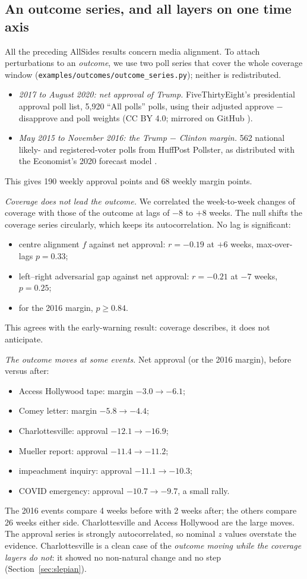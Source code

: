 \documentclass[11pt]{article}
\theoremstyle{definition}
\theoremstyle{remark}
\begin{document}
\subsection{An outcome series, and all layers on one time axis}\label{sec:outcomeseries}
All the preceding AllSides results concern media alignment. To attach perturbations to an \emph{outcome}, we use two poll series that cover the whole coverage window (\texttt{examples/outcomes/outcome\_series.py}); neither is redistributed.
\begin{itemize}
  \item \emph{2017 to August 2020: net approval of Trump.} FiveThirtyEight's presidential approval poll list, 5{,}920 ``All polls'' polls, using their adjusted approve $-$ disapprove and poll weights (CC BY 4.0; mirrored on GitHub \cite{fte}).
  \item \emph{May 2015 to November 2016: the Trump $-$ Clinton margin.} 562 national likely- and registered-voter polls from HuffPost Pollster, as distributed with the Economist's 2020 forecast model \cite{econpolls}.
\end{itemize}
This gives 190 weekly approval points and 68 weekly margin points.

\emph{Coverage does not lead the outcome.} We correlated the week-to-week changes of coverage with those of the outcome at lags of $-8$ to $+8$ weeks. The null shifts the coverage series circularly, which keeps its autocorrelation. No lag is significant:
\begin{itemize}
  \item centre alignment $f$ against net approval: $r=-0.19$ at $+6$ weeks, max-over-lags $p=0.33$;
  \item left--right adversarial gap against net approval: $r=-0.21$ at $-7$ weeks, $p=0.25$;
  \item for the 2016 margin, $p\ge0.84$.
\end{itemize}
This agrees with the early-warning result: coverage describes, it does not anticipate.

\emph{The outcome moves at some events.} Net approval (or the 2016 margin), before versus after:
\begin{itemize}
  \item Access Hollywood tape: margin $-3.0\to-6.1$;
  \item Comey letter: margin $-5.8\to-4.4$;
  \item Charlottesville: approval $-12.1\to-16.9$;
  \item Mueller report: approval $-11.4\to-11.2$;
  \item impeachment inquiry: approval $-11.1\to-10.3$;
  \item COVID emergency: approval $-10.7\to-9.7$, a small rally.
\end{itemize}
The 2016 events compare 4 weeks before with 2 weeks after; the others compare 26 weeks either side. Charlottesville and Access Hollywood are the large moves. The approval series is strongly autocorrelated, so nominal $z$ values overstate the evidence. Charlottesville is a clean case of the \emph{outcome moving while the coverage layers do not}: it showed no non-natural change and no step (Section~\ref{sec:slepian}).
\end{document}
